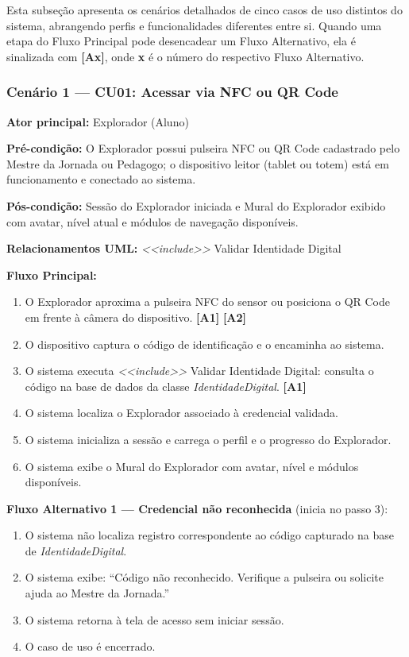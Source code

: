 \documentclass[12pt, a4paper]{article}
\begin{document}
Esta subseção apresenta os cenários detalhados de cinco casos de uso distintos do
sistema, abrangendo perfis e funcionalidades diferentes entre si. Quando uma etapa
do Fluxo Principal pode desencadear um Fluxo Alternativo, ela é sinalizada com
\textbf{[Ax]}, onde \textbf{x} é o número do respectivo Fluxo Alternativo.

\subsubsection*{Cenário 1 --- CU01: Acessar via NFC ou QR Code}

\noindent\textbf{Ator principal:} Explorador (Aluno)

\noindent\textbf{Pré-condição:} O Explorador possui pulseira NFC ou QR Code cadastrado pelo
Mestre da Jornada ou Pedagogo; o dispositivo leitor (tablet ou totem) está em
funcionamento e conectado ao sistema.

\noindent\textbf{Pós-condição:} Sessão do Explorador iniciada e Mural do Explorador exibido
com avatar, nível atual e módulos de navegação disponíveis.

\noindent\textbf{Relacionamentos UML:} \textit{<<include>>} Validar Identidade Digital

\medskip
\textbf{Fluxo Principal:}
\begin{enumerate}
    \item O Explorador aproxima a pulseira NFC do sensor ou posiciona o QR Code em frente à câmera do dispositivo. \textbf{[A1]} \textbf{[A2]}
    \item O dispositivo captura o código de identificação e o encaminha ao sistema.
    \item O sistema executa \textit{<<include>>} Validar Identidade Digital: consulta o código na base de dados da classe \textit{IdentidadeDigital}. \textbf{[A1]}
    \item O sistema localiza o Explorador associado à credencial validada.
    \item O sistema inicializa a sessão e carrega o perfil e o progresso do Explorador.
    \item O sistema exibe o Mural do Explorador com avatar, nível e módulos disponíveis.
\end{enumerate}

\textbf{Fluxo Alternativo 1 --- Credencial não reconhecida} (inicia no passo 3):
\begin{enumerate}
    \item O sistema não localiza registro correspondente ao código capturado na base de \textit{IdentidadeDigital}.
    \item O sistema exibe: ``Código não reconhecido. Verifique a pulseira ou solicite ajuda ao Mestre da Jornada.''
    \item O sistema retorna à tela de acesso sem iniciar sessão.
    \item O caso de uso é encerrado.
\end{enumerate}
\end{document}
